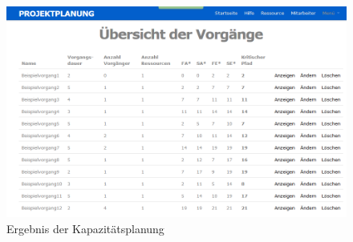 \documentclass[a4paper,12pt,parskip,bibtotoc,liststotoc]{article}
\begin{document}
\begin{figure}[h!]
  \begin{center}
    \includegraphics[width=120mm]{Bilder/Vorgaenge_Kostenpl.png}
    \caption{Ergebnis der Kapazitätsplanung}  \label{VorKo}
  \end{center}
\end{figure}
\end{document}
